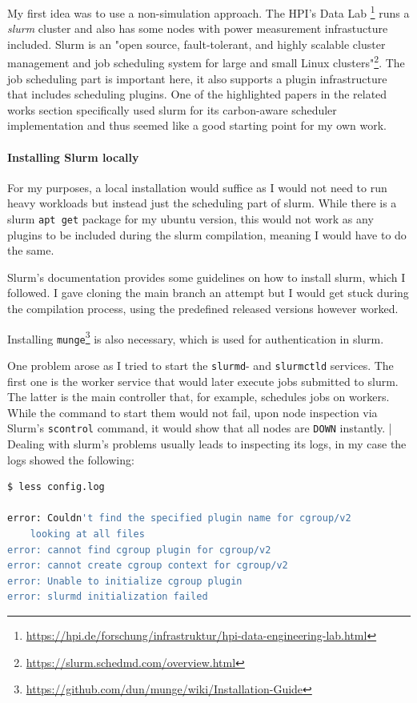 My first idea was to use a non-simulation approach. 
The HPI's Data Lab \footnote{\url{https://hpi.de/forschung/infrastruktur/hpi-data-engineering-lab.html}} runs a \emph{slurm} cluster and also has some nodes with power measurement infrastucture included. 
Slurm is an "open source, fault-tolerant, and highly scalable cluster management and job scheduling system for large and small Linux clusters"\footnote{\url{https://slurm.schedmd.com/overview.html}}. 
The job scheduling part is important here, it also supports a plugin infrastructure that includes scheduling plugins. 
One of the highlighted papers\cite{inigo_goiri_greenslot_2011} in the related works section specifically used slurm for its carbon-aware scheduler implementation and thus seemed like a good starting point for my own work.

\paragraph{Installing Slurm locally}

For my purposes, a local installation would suffice as I would not need to run heavy workloads but instead just the scheduling part of slurm. 
While there is a slurm \verb|apt get| package for my ubuntu version, this would not work as any plugins to be included during the slurm compilation, meaning I would have to do the same.

Slurm's documentation provides some guidelines on how to install slurm, which I followed. 
I gave cloning the main branch an attempt but I would get stuck during the compilation process, using the predefined released versions however worked.

Installing \verb|munge|\footnote{\url{https://github.com/dun/munge/wiki/Installation-Guide}} is also necessary, which is used for authentication in slurm.

One problem arose as I tried to start the \verb|slurmd|- and \verb|slurmctld| services. The first one is the worker service that would later execute jobs submitted to slurm. The latter is the main controller that, for example, schedules jobs on workers. While the command to start them would not fail, upon node inspection via Slurm's \verb|scontrol| command, it would show that all nodes are \verb|DOWN| instantly.
|
Dealing with slurm's problems usually leads to inspecting its logs, in my case the logs showed the following:

\begin{lstlisting}[language=bash, frame=single, numbers=none, caption={Slurm error logs}, basicstyle=\ttfamily]
$ less config.log

error: Couldn't find the specified plugin name for cgroup/v2
    looking at all files
error: cannot find cgroup plugin for cgroup/v2
error: cannot create cgroup context for cgroup/v2
error: Unable to initialize cgroup plugin
error: slurmd initialization failed

\end{lstlisting}

